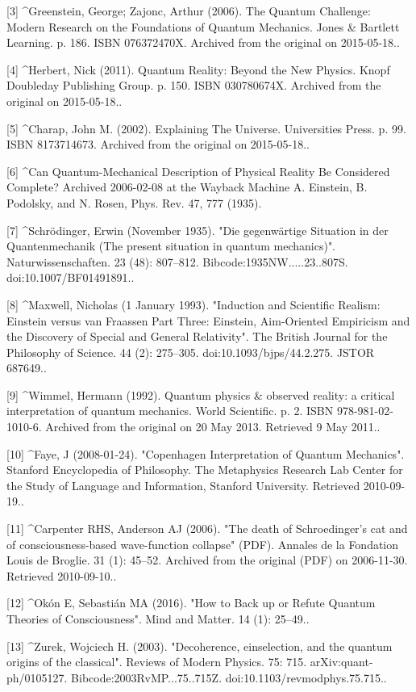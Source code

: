 [3]
^Greenstein, George; Zajonc, Arthur (2006). The Quantum Challenge: Modern Research on the Foundations of Quantum Mechanics. Jones & Bartlett Learning. p. 186. ISBN 076372470X. Archived from the original on 2015-05-18..

[4]
^Herbert, Nick (2011). Quantum Reality: Beyond the New Physics. Knopf Doubleday Publishing Group. p. 150. ISBN 030780674X. Archived from the original on 2015-05-18..

[5]
^Charap, John M. (2002). Explaining The Universe. Universities Press. p. 99. ISBN 8173714673. Archived from the original on 2015-05-18..

[6]
^Can Quantum-Mechanical Description of Physical Reality Be Considered Complete? Archived 2006-02-08 at the Wayback Machine A. Einstein, B. Podolsky, and N. Rosen, Phys. Rev. 47, 777 (1935).

[7]
^Schrödinger, Erwin (November 1935). "Die gegenwärtige Situation in der Quantenmechanik (The present situation in quantum mechanics)". Naturwissenschaften. 23 (48): 807–812. Bibcode:1935NW.....23..807S. doi:10.1007/BF01491891..

[8]
^Maxwell, Nicholas (1 January 1993). "Induction and Scientific Realism: Einstein versus van Fraassen Part Three: Einstein, Aim-Oriented Empiricism and the Discovery of Special and General Relativity". The British Journal for the Philosophy of Science. 44 (2): 275–305. doi:10.1093/bjps/44.2.275. JSTOR 687649..

[9]
^Wimmel, Hermann (1992). Quantum physics & observed reality: a critical interpretation of quantum mechanics. World Scientific. p. 2. ISBN 978-981-02-1010-6. Archived from the original on 20 May 2013. Retrieved 9 May 2011..

[10]
^Faye, J (2008-01-24). "Copenhagen Interpretation of Quantum Mechanics". Stanford Encyclopedia of Philosophy. The Metaphysics Research Lab Center for the Study of Language and Information, Stanford University. Retrieved 2010-09-19..

[11]
^Carpenter RHS, Anderson AJ (2006). "The death of Schroedinger's cat and of consciousness-based wave-function collapse" (PDF). Annales de la Fondation Louis de Broglie. 31 (1): 45–52. Archived from the original (PDF) on 2006-11-30. Retrieved 2010-09-10..

[12]
^Okón E, Sebastián MA (2016). "How to Back up or Refute Quantum Theories of Consciousness". Mind and Matter. 14 (1): 25–49..

[13]
^Zurek, Wojciech H. (2003). "Decoherence, einselection, and the quantum origins of the classical". Reviews of Modern Physics. 75: 715. arXiv:quant-ph/0105127. Bibcode:2003RvMP...75..715Z. doi:10.1103/revmodphys.75.715..

